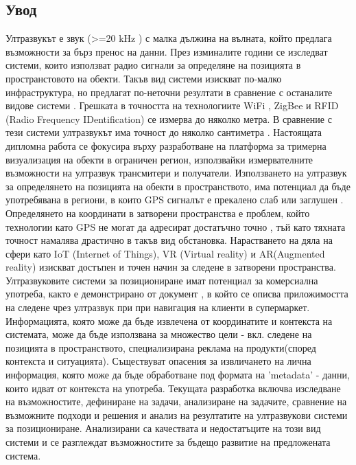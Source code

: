 \subsection{Увод}
\tab Ултразвукът е звук (>=20 kHz \cite{batmobile}) с малка дължина на вълната, който предлага възможности за бърз пренос на данни. През изминалите години се изследват системи, които използват радио сигнали за определяне на позицията в пространстовото на обекти. Такъв вид системи изискват по-малко инфраструктура, но предлагат по-неточни резултати в сравнение с останалите видове системи \cite{CarlosMedina}. Грешката в точността на технологиите WiFi \cite{wifi}, ZigBee \cite{zigbee} и RFID (Radio Frequency IDentification) \cite{rfid} се измерва до няколко метра. В сравнение с тези системи ултразвукът има точност до няколко сантиметра \cite{CarlosMedina} \cite{columbia}. Настоящата дипломна работа се фокусира върху разработване на платформа за тримерна визуализация на обекти в ограничен регион, използвайки измервателните възможности на ултразвук трансмитери и получатели. Използването на ултразвук за определянето на позицията на обекти в пространството, има потенциал да бъде употребявана в региони, в които GPS сигналът е прекалено слаб или заглушен \cite{yonei}. Определянето на координати в затворени пространства е проблем, който технологии като GPS не могат да адресират достатъчно точно \cite{gpsIsBadIndoor}, тъй като тяхната точност намалява драстично в такъв вид обстановка. Нарастването на дяла на сфери като IoT (Internet of Things), VR (Virtual reality) и AR(Augmented reality) изискват достъпен и точен начин за следене в затворени пространства. Ултразвуковите системи за позициониране имат потенциал за комерсиална употреба, както е демонстрирано от документ \cite{batmobile}, в който се описва приложимостта на следене чрез ултразвук при при навигация на клиенти в супермаркет. Информацията, която може да бъде извлечена от координатите и контекста на системата, може да бъде използвана за множество цели - вкл. следене на позицията в пространството, специализирана реклама на продукти(според контекста и ситуацията). Съществуват опасения за извличането на лична информация, която може да бъде обработване под формата на 'metadata' - данни, които идват от контекста на употреба. Текущата разработка включва изследване на възможностите, дефиниране на задачи, анализиране на задачите, сравнение на възможните подходи и решения и анализ на резултатите на ултразвукови системи за позициониране. Анализирани са качествата и недостатъците на този вид системи и се разглеждат възможностите за бъдещо развитие на предложената система.

